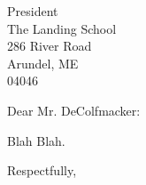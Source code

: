 \documentclass{letter}
\begin{document}
 
\begin{letter}{President \\ The Landing School \\ 286 River Road 
\\ Arundel, ME \\ 04046 }
\opening{Dear Mr. DeColfmacker:}
 
Blah Blah.
 
\closing{Respectfully,}
 
\end{letter}
 
\end{document}
